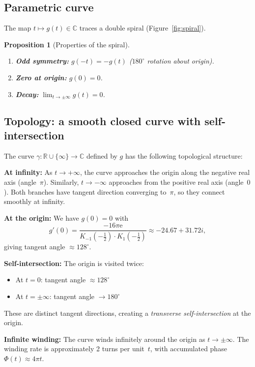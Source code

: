 \documentclass[11pt]{article}
\newtheorem{proposition}[theorem]{Proposition}
\theoremstyle{definition}
\theoremstyle{remark}
\newcommand{\ee}{\mathrm{e}}
\newcommand{\R}{\mathbb{R}}
\newcommand{\C}{\mathbb{C}}
\begin{document}
\subsection{Parametric curve}

The map $t \mapsto g(t) \in \C$ traces a double spiral (Figure~\ref{fig:spiral}).

\begin{proposition}[Properties of the spiral]
\leavevmode
\begin{enumerate}
\item \textbf{Odd symmetry:} $g(-t) = -g(t)$ ($180^\circ$ rotation about origin).
\item \textbf{Zero at origin:} $g(0) = 0$.
\item \textbf{Decay:} $\lim_{t \to \pm\infty} g(t) = 0$.
\end{enumerate}
\end{proposition}

\subsection{Topology: a smooth closed curve with self-intersection}

The curve $\gamma: \R \cup \{\infty\} \to \C$ defined by $g$ has the following
topological structure:

\textbf{At infinity:} As $t \to +\infty$, the curve approaches the origin
along the negative real axis (angle~$\pi$). Similarly, $t \to -\infty$
approaches from the positive real axis (angle~$0$). Both branches have
tangent direction converging to~$\pi$, so they connect smoothly at infinity.

\textbf{At the origin:} We have $g(0) = 0$ with
\[
g'(0) = \frac{-16\pi\ee}{K_{-1}(-\tfrac{1}{2}) \cdot K_1(-\tfrac{1}{2})}
\approx -24.67 + 31.72i,
\]
giving tangent angle $\approx 128^\circ$.

\textbf{Self-intersection:} The origin is visited twice:
\begin{itemize}
\item At $t = 0$: tangent angle $\approx 128^\circ$
\item At $t = \pm\infty$: tangent angle $\to 180^\circ$
\end{itemize}
These are distinct tangent directions, creating a \emph{transverse
self-intersection} at the origin.

\textbf{Infinite winding:} The curve winds infinitely around the origin as
$t \to \pm\infty$. The winding rate is approximately 2 turns per unit~$t$,
with accumulated phase $\Phi(t) \approx 4\pi t$.
\end{document}
